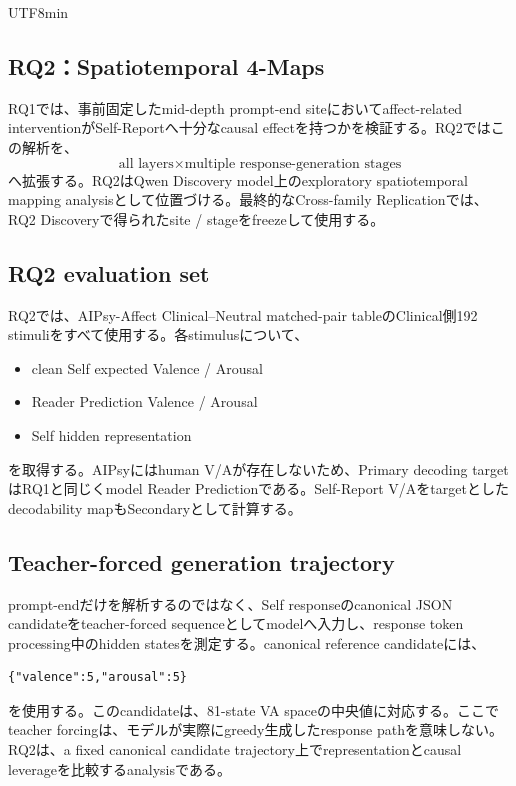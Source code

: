 \documentclass{article} %
\begin{document}
\begin{CJK*}{UTF8}{min}

\subsection{RQ2：Spatiotemporal 4-Maps}
\label{app:v3-rq2}

RQ1では、事前固定したmid-depth prompt-end siteにおいてaffect-related interventionがSelf-Reportへ十分なcausal effectを持つかを検証する。RQ2ではこの解析を、
\[
\text{all layers}
\times
\text{multiple response-generation stages}
\]
へ拡張する。RQ2はQwen Discovery model上のexploratory spatiotemporal mapping analysisとして位置づける。最終的なCross-family Replicationでは、RQ2 Discoveryで得られたsite / stageをfreezeして使用する。


\subsection{RQ2 evaluation set}

RQ2では、AIPsy-Affect Clinical--Neutral matched-pair tableのClinical側192 stimuliをすべて使用する。各stimulusについて、

\begin{itemize}
    \item clean Self expected Valence / Arousal
    \item Reader Prediction Valence / Arousal
    \item Self hidden representation
\end{itemize}
を取得する。AIPsyにはhuman V/Aが存在しないため、Primary decoding targetはRQ1と同じくmodel Reader Predictionである。Self-Report V/Aをtargetとしたdecodability mapもSecondaryとして計算する。


\subsection{Teacher-forced generation trajectory}

prompt-endだけを解析するのではなく、Self responseのcanonical JSON candidateをteacher-forced sequenceとしてmodelへ入力し、response token processing中のhidden statesを測定する。canonical reference candidateには、
\begin{verbatim}
{"valence":5,"arousal":5}
\end{verbatim}
を使用する。このcandidateは、81-state VA spaceの中央値に対応する。ここでteacher forcingは、モデルが実際にgreedy生成したresponse pathを意味しない。RQ2は、a fixed canonical candidate trajectory上でrepresentationとcausal leverageを比較するanalysisである。



\end{CJK*}
\end{document}
